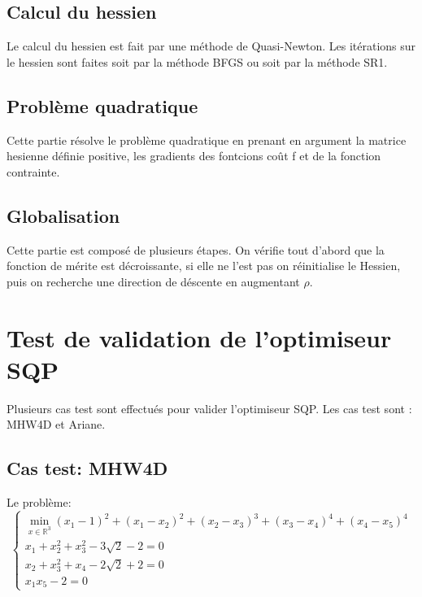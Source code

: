 \documentclass[a4paper,20pt]{article}
\begin{document}
\subsection{Calcul du hessien}
Le calcul du hessien est fait par une m\'ethode de Quasi-Newton. Les
 it\'erations sur le hessien sont faites soit par la méthode BFGS ou soit par la
 méthode SR1.

\subsection{Probl\`eme quadratique}
Cette partie r\'esolve le probl\`eme quadratique en prenant en argument la
 matrice hesienne d\'efinie positive, les gradients des fontcions co\^ut f et de
 la fonction contrainte.

\subsection{Globalisation}
Cette partie est compos\'e de plusieurs \'etapes. On v\'erifie tout d'abord que
 la fonction de m\'erite est d\'ecroissante, si elle ne l'est pas on
 r\'einitialise le Hessien, puis on recherche une direction de d\'escente en
 augmentant $\rho$.

\section{Test de validation de l'optimiseur SQP}
Plusieurs cas test sont effectu\'es pour valider l'optimiseur SQP. Les cas test
 sont : MHW4D et Ariane.


\subsection {Cas test: MHW4D}
Le probl\`eme:
$$
\begin{cases}
\min\limits_{x\in\mathbb{R}^3}{(x_1-1)^2+(x_1-x_2)^2+(x_2-x_3)^3+(x_3-x_4)^4
+(x_4-x_5)^4} \\
x_1+x_2^2+x_3^2-3\sqrt{2}-2=0 \\
x_2+x_3^2+x_4-2\sqrt{2}+2=0 \\
x_1x_5-2=0
\end{cases}
$$
\end{document}
